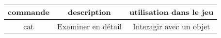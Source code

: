 \documentclass[a4paper,11pt]{article}
\begin{document}
\begin{center}
    \begin{tabular}{|*{3}{c|}}
        \hline
        commande & description & utilisation dans le jeu \\
        \hline
        cat & Examiner en détail & Interagir avec un objet\\
        \hline
    \end{tabular}
    \label{tab}
\end{center}
\end{document}
